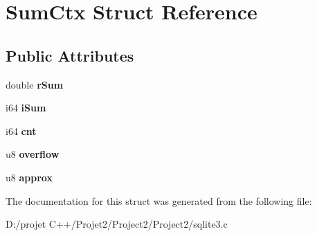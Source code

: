 \hypertarget{struct_sum_ctx}{}\section{Sum\+Ctx Struct Reference}
\label{struct_sum_ctx}
\subsection*{Public Attributes}
\begin{DoxyCompactItemize}
\item 
\mbox{\label{struct_sum_ctx_a1774080b9bcada2f4e867eaf40763f41}} 
double {\bfseries r\+Sum}
\item 
\mbox{\label{struct_sum_ctx_ace6196fb30ebc0687997a723d55683db}} 
i64 {\bfseries i\+Sum}
\item 
\mbox{\label{struct_sum_ctx_ada00261fe604a7cc6719fdcd8bb5914c}} 
i64 {\bfseries cnt}
\item 
\mbox{\label{struct_sum_ctx_a3b14a5da00584aff08314d5e9ddbe9ea}} 
u8 {\bfseries overflow}
\item 
\mbox{\label{struct_sum_ctx_a035a2a22271fee066d9a92d12fe3b9a5}} 
u8 {\bfseries approx}
\end{DoxyCompactItemize}


The documentation for this struct was generated from the following file\+:\begin{DoxyCompactItemize}
\item 
D\+:/projet C++/\+Projet2/\+Project2/\+Project2/sqlite3.\+c\end{DoxyCompactItemize}
